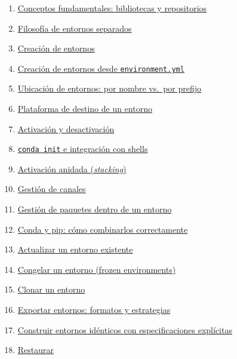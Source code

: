 \documentclass[
  doc,
  floatsintext,
  longtable,
  a4paper,
  nolmodern,
  notxfonts,
  notimes,
  12pt,
  colorlinks=true,linkcolor=blue,citecolor=blue,urlcolor=blue]{apa7}
\providecommand{\tightlist}{%
  \setlength{\itemsep}{0pt}\setlength{\parskip}{0pt}}
\begin{document}
\begin{enumerate}
\def\labelenumi{\arabic{enumi}.}
\tightlist
\item
  \hyperref[1-conceptos-fundamentales-bibliotecas-y-repositorios]{Conceptos
  fundamentales: bibliotecas y repositorios}
\item
  \hyperref[2-filosofuxeda-de-entornos-separados]{Filosofía de entornos
  separados}
\item
  \hyperref[3-creaciuxf3n-de-entornos]{Creación de entornos}
\item
  \hyperref[4-creaciuxf3n-de-entornos-desde-environmentyml]{Creación de
  entornos desde \texttt{environment.yml}}
\item
  \hyperref[5-ubicaciuxf3n-de-entornos-por-nombre-vs-por-prefijo]{Ubicación
  de entornos: por nombre vs.~por prefijo}
\item
  \hyperref[6-plataforma-de-destino-de-un-entorno]{Plataforma de destino
  de un entorno}
\item
  \hyperref[7-activaciuxf3n-y-desactivaciuxf3n]{Activación y
  desactivación}
\item
  \hyperref[8-conda-init-e-integraciuxf3n-con-shells]{\texttt{conda\ init}
  e integración con shells}
\item
  \hyperref[9-activaciuxf3n-anidada-stacking]{Activación anidada
  (\emph{stacking})}
\item
  \hyperref[10-gestiuxf3n-de-canales]{Gestión de canales}
\item
  \hyperref[11-gestiuxf3n-de-paquetes-dentro-de-un-entorno]{Gestión de
  paquetes dentro de un entorno}
\item
  \hyperref[12-conda-y-pip-cuxf3mo-combinarlos-correctamente]{Conda y
  pip: cómo combinarlos correctamente}
\item
  \hyperref[13-actualizar-un-entorno-existente]{Actualizar un entorno
  existente}
\item
  \hyperref[14-congelar-un-entorno-frozen-environments]{Congelar un
  entorno (frozen environments)}
\item
  \hyperref[15-clonar-un-entorno]{Clonar un entorno}
\item
  \hyperref[16-exportar-entornos-formatos-y-estrategias]{Exportar
  entornos: formatos y estrategias}
\item
  \hyperref[17-construir-entornos-iduxe9nticos-con-especificaciones-expluxedcitas]{Construir
  entornos idénticos con especificaciones explícitas}
\item
  \hyperref[18-restaurar-un-entorno-a-una-revisiuxf3n-anterior]{Restaurar
}
\end{enumerate}
\end{document}
